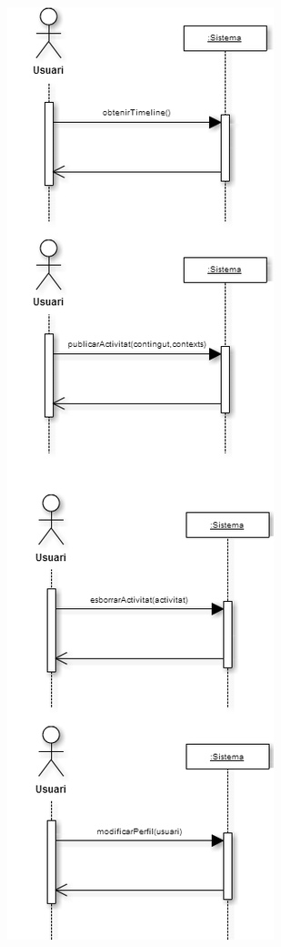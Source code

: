 \begin{figure}[ht]
    \begin{minipage}[t]{.48\textwidth}
        \centering
        \includegraphics*[scale=0.7,viewport=0 265 322 567]{Memoria/Especificacio/model_comportament.png}

\end{minipage}
\end{figure}
